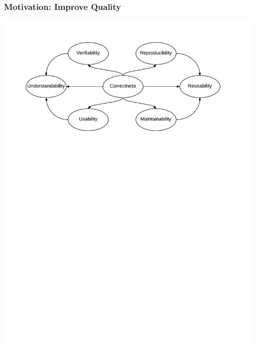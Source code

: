 \documentclass{beamer}
\begin{document}
\begin{frame}

\frametitle{Motivation: Improve Quality}

\includegraphics[width=1\textwidth]{RelationBWQualities.pdf}

\end{frame}





\end{document}
